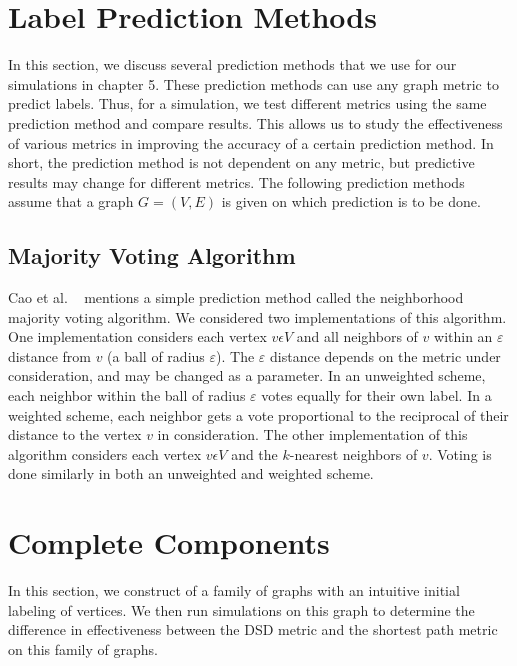 \section{Label Prediction Methods}
In this section, we discuss several prediction methods that we use for our simulations in chapter 5. These prediction methods can use any graph metric to predict labels. Thus, for a simulation, we test different metrics using the same prediction method and compare results. This allows us to study the effectiveness of various metrics in improving the accuracy of a certain prediction method. In short, the prediction method is not dependent on any metric, but predictive results may change for different metrics. The following prediction methods assume that a graph $G=(V,E)$ is given on which prediction is to be done.

\subsection{Majority Voting Algorithm}
Cao et al. ~\cite{10.1371/journal.pone.0076339} mentions a simple prediction method called the neighborhood majority voting algorithm. We considered two implementations of this algorithm. One implementation considers each vertex $v \epsilon V$ and all neighbors of $v$ within an $\varepsilon$ distance from $v$ (a ball of radius $\varepsilon$). The $\varepsilon$ distance depends on the metric under consideration, and may be changed as a parameter. In an unweighted scheme, each neighbor within the ball of radius $\varepsilon$ votes equally for their own label. In a weighted scheme, each neighbor gets a vote proportional to the reciprocal of their distance to the vertex $v$ in consideration. The other implementation of this algorithm considers each vertex $v \epsilon V$ and the $k$-nearest neighbors of $v$. Voting is done similarly in both an unweighted and weighted scheme.


\section{Complete Components}
In this section, we construct of a family of graphs with an intuitive initial labeling of vertices. We then run simulations on this graph to determine the difference in effectiveness between the DSD metric and the shortest path metric on this family of graphs.


